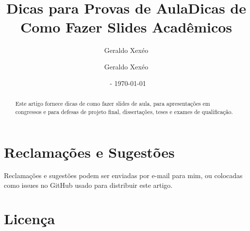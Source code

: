 \documentclass[12pt,a4paper]{article}
\title{Dicas para Provas de Aula}
\author{Geraldo Xexéo}
\affil{\url{xexeo@ufrj.br} \\
    \url{http://xexeo.net}}
\date{\ccbyncsa\  - \today}
\author{Geraldo Xexéo}
\title{Dicas de Como Fazer Slides Acadêmicos}
\begin{document}
\maketitle

\begin{abstract}
    Este artigo fornece dicas de como fazer slides de aula, para apresentações em congressos e para defesas de projeto final, dissertações, teses e exames de qualificação.
\end{abstract}

\tableofcontents
















\printbibliography


\section*{Reclamações e Sugestões}

Reclamações e sugestões podem ser enviadas por e-mail para mim, ou colocadas como issues no GitHub usado para distribuir este artigo.

\section*{Licença}


\end{document}
